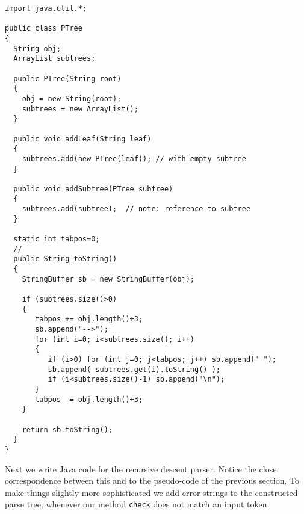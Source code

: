 {\footnotesize%
\renewcommand{\ttdefault}{pcr} %
\begin{verbatim}
import java.util.*;

public class PTree
{ 
  String obj;
  ArrayList subtrees;
  
  public PTree(String root) 
  { 
    obj = new String(root);
    subtrees = new ArrayList();
  }

  public void addLeaf(String leaf)
  {
    subtrees.add(new PTree(leaf)); // with empty subtree
  }

  public void addSubtree(PTree subtree)
  {
    subtrees.add(subtree);  // note: reference to subtree
  }

  static int tabpos=0;
  //
  public String toString()
  {
    StringBuffer sb = new StringBuffer(obj);

    if (subtrees.size()>0) 
    {
       tabpos += obj.length()+3;
       sb.append("-->");
       for (int i=0; i<subtrees.size(); i++)
       {
          if (i>0) for (int j=0; j<tabpos; j++) sb.append(" ");
          sb.append( subtrees.get(i).toString() );
          if (i<subtrees.size()-1) sb.append("\n");
       }
       tabpos -= obj.length()+3;
    }

    return sb.toString();
  }
}
\end{verbatim}%
}%

Next we write Java code for the recursive descent parser.  Notice the
close correspondence between this and 
to the pseudo-code of the previous section.  To make things slightly
more sophisticated we add error strings to the constructed parse tree, 
whenever our method \verb|check| does not match an input token.

